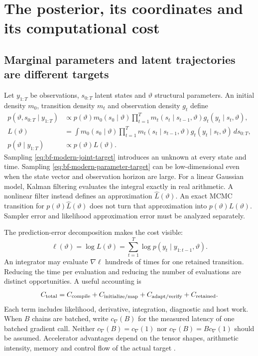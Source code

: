 \section[Posterior, coordinates and cost]{The posterior, its coordinates and its computational cost}
\label{sec:bf-modern-target}

\subsection{Marginal parameters and latent trajectories are different targets}

Let $y_{1:T}$ be observations, $s_{0:T}$ latent states and $\vartheta$
structural parameters. An initial density $m_0$, transition density $m_t$ and
observation density $g_t$ define
\begin{align}
 p(\vartheta,s_{0:T}\mid y_{1:T})
 &\propto p(\vartheta)m_0(s_0\mid\vartheta)
   \prod_{t=1}^T m_t(s_t\mid s_{t-1},\vartheta)
                    g_t(y_t\mid s_t,\vartheta),
 \label{eq:bf-modern-joint-target}\\
 L(\vartheta)&=\int m_0(s_0\mid\vartheta)
   \prod_{t=1}^T m_t(s_t\mid s_{t-1},\vartheta)
                    g_t(y_t\mid s_t,\vartheta)\,ds_{0:T},
 \label{eq:bf-modern-marginal-likelihood}\\
 p(\vartheta\mid y_{1:T})&\propto p(\vartheta)L(\vartheta).
 \label{eq:bf-modern-parameter-target}
\end{align}
Sampling \eqref{eq:bf-modern-joint-target} introduces an unknown at every
state and time. Sampling \eqref{eq:bf-modern-parameter-target} can be
low-dimensional even when the state vector and observation horizon are large.
For a linear Gaussian model, Kalman filtering evaluates the integral exactly
in real arithmetic. A nonlinear filter instead defines an approximation
$\widehat L(\vartheta)$. An exact MCMC transition for
$p(\vartheta)\widehat L(\vartheta)$ does not turn that approximation into
$p(\vartheta)L(\vartheta)$. Sampler error and likelihood approximation
error must be analyzed separately.

The prediction-error decomposition makes the cost visible:
\begin{equation}
 \ell(\vartheta)=\log L(\vartheta)
       =\sum_{t=1}^T\log p(y_t\mid y_{1:t-1},\vartheta).
 \label{eq:bf-modern-prediction-error}
\end{equation}
An integrator may evaluate $\nabla\ell$ hundreds of times for one retained
transition. Reducing the time per evaluation and reducing the number of
evaluations are distinct opportunities. A useful accounting is
\begin{equation}
 C_{\rm total}=C_{\rm compile}+C_{\rm initialize/map}
       +C_{\rm adapt/verify}+C_{\rm retained}.
 \label{eq:bf-modern-cost}
\end{equation}
Each term includes likelihood, derivative, integration, diagnostic and host
work. When $B$ chains are batched, write $c_{\nabla}(B)$ for the measured
latency of one batched gradient call. Neither
$c_{\nabla}(B)=c_{\nabla}(1)$ nor
$c_{\nabla}(B)=B c_{\nabla}(1)$ should be assumed. Accelerator advantages
depend on the tensor shapes, arithmetic intensity, memory and control flow
of the actual target \citep{sountsov2024hardware}.


